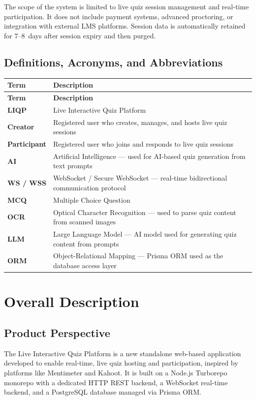 \documentclass[12pt,a4paper]{article}
\begin{document}
\noindent The scope of the system is limited to live quiz session management and
real-time participation. It does not include payment systems, advanced proctoring,
or integration with external LMS platforms. Session data is automatically retained
for 7--8~days after session expiry and then purged.

\subsection{Definitions, Acronyms, and Abbreviations}

\begin{longtable}{>{\bfseries}p{2.8cm} p{11cm}}
  \toprule
  \textbf{Term} & \textbf{Description} \\
  \midrule
  \endfirsthead
  \toprule
  \textbf{Term} & \textbf{Description} \\
  \midrule
  \endhead
  \bottomrule
  \endfoot
  LIQP  & Live Interactive Quiz Platform \\[3pt]
  Creator & Registered user who creates, manages, and hosts live quiz sessions \\[3pt]
  Participant & Registered user who joins and responds to live quiz sessions \\[3pt]
  AI    & Artificial Intelligence --- used for AI-based quiz generation from text prompts \\[3pt]
  WS / WSS & WebSocket / Secure WebSocket --- real-time bidirectional communication protocol \\[3pt]
  MCQ   & Multiple Choice Question \\[3pt]
  OCR   & Optical Character Recognition --- used to parse quiz content from scanned images \\[3pt]
  LLM   & Large Language Model --- AI model used for generating quiz content from prompts \\[3pt]
  ORM   & Object-Relational Mapping --- Prisma ORM used as the database access layer \\
\end{longtable}

\section{Overall Description}

\subsection{Product Perspective}
The Live Interactive Quiz Platform is a new standalone web-based application
developed to enable real-time, live quiz hosting and participation, inspired by
platforms like Mentimeter and Kahoot. It is built on a Node.js Turborepo monorepo
with a dedicated HTTP REST backend, a WebSocket real-time backend, and a PostgreSQL
database managed via Prisma ORM.
\end{document}
